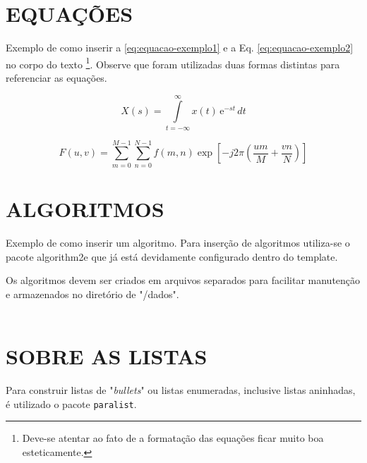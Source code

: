 \chapter{EQUAÇÕES}
\label{chap:equacoes}

Exemplo de como inserir a \autoref{eq:equacao-exemplo1} e a Eq. \ref{eq:equacao-exemplo2} no corpo do texto \footnote{Deve-se atentar ao fato de a formatação das equações ficar muito boa esteticamente.}. Observe que foram utilizadas duas formas distintas para referenciar as equações.

\begin{equation}
    X(s) = \int\limits_{t = -\infty}^{\infty} x(t) \, \text{e}^{-st} \, dt
    \label{eq:equacao-exemplo1}
\end{equation}

\begin{equation}
    F(u, v) = \sum_{m = 0}^{M - 1} \sum_{n = 0}^{N - 1} f(m, n) \exp \left[ -j 2 \pi \left( \frac{u m}{M} + \frac{v n}{N} \right) \right]
    \label{eq:equacao-exemplo2}
\end{equation}

\chapter{ALGORITMOS}
\label{chap:algoritmos}

Exemplo de como inserir um algoritmo. Para inserção de algoritmos utiliza-se o pacote {\ttfamily algorithm2e} que já está devidamente configurado dentro do template.

Os algoritmos devem ser criados em arquivos separados para facilitar manutenção e armazenados no diretório de "/dados".\\
\\



\chapter{SOBRE AS LISTAS}
\label{chap:apSobreLista}

Para construir listas de "\textit{bullets}"{} ou listas enumeradas, inclusive listas aninhadas, é utilizado o pacote \verb|paralist|.

